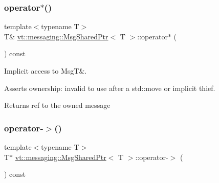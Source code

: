 \mbox{\label{structvt_1_1messaging_1_1_msg_shared_ptr_a609cd3703233ec7a0e26db0ff457b8f7}} 
\subsubsection{\texorpdfstring{operator$\ast$()}{operator*()}}
{\footnotesize\ttfamily template$<$typename T$>$ \\
T\& \hyperlink{structvt_1_1messaging_1_1_msg_shared_ptr}{vt\+::messaging\+::\+Msg\+Shared\+Ptr}$<$ T $>$\+::operator$\ast$ (\begin{DoxyParamCaption}{ }\end{DoxyParamCaption}) const\hspace{0.3cm}{\ttfamily [inline]}}



Implicit access to MsgT\&. 

Asserts ownership\+: invalid to use after a std\+::move or implicit thief.

\begin{DoxyReturn}{Returns}
ref to the owned message 
\end{DoxyReturn}
\mbox{\label{structvt_1_1messaging_1_1_msg_shared_ptr_a4140dc4ea157de37d258c8f8821179c8}} 
\subsubsection{\texorpdfstring{operator-\/$>$()}{operator->()}}
{\footnotesize\ttfamily template$<$typename T$>$ \\
T$\ast$ \hyperlink{structvt_1_1messaging_1_1_msg_shared_ptr}{vt\+::messaging\+::\+Msg\+Shared\+Ptr}$<$ T $>$\+::operator-\/$>$ (\begin{DoxyParamCaption}{ }\end{DoxyParamCaption}) const\hspace{0.3cm}{\ttfamily [inline]}}



